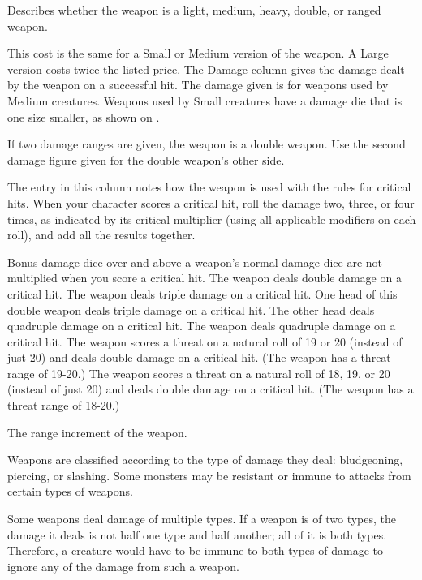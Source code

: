  Describes whether the weapon is a light, medium, heavy, double, or ranged weapon.

\par This cost is the same for a Small or Medium version of the weapon. A Large version costs twice the listed price.
 The Damage column gives the damage dealt by the weapon on a successful hit. The damage given is for weapons used by Medium creatures. Weapons used by Small creatures have a damage die that is one size smaller, as shown on .

If two damage ranges are given, the weapon is a double weapon. Use the second damage figure given for the double weapon's other side.

 The entry in this column notes how the weapon is used with the rules for critical hits. When your character scores a critical hit, roll the damage two, three, or four times, as indicated by its critical multiplier (using all applicable modifiers on each roll), and add all the results together.

 Bonus damage dice over and above a weapon's normal damage dice are not multiplied when you score a critical hit.
 The weapon deals double damage on a critical hit.
 The weapon deals triple damage on a critical hit.
 One head of this double weapon deals triple damage on a critical hit. The other head deals quadruple damage on a critical hit.
 The weapon deals quadruple damage on a critical hit.
 The weapon scores a threat on a natural roll of 19 or 20 (instead of just 20) and deals double damage on a critical hit. (The weapon has a threat range of 19-20.)
 The weapon scores a threat on a natural roll of 18, 19, or 20 (instead of just 20) and deals double damage on a critical hit. (The weapon has a threat range of 18-20.)

 The range increment of the weapon.

 Weapons are classified according to the type of damage they deal: bludgeoning, piercing, or slashing. Some monsters may be resistant or immune to attacks from certain types of weapons.

Some weapons deal damage of multiple types. If a weapon is of two types, the damage it deals is not half one type and half another; all of it is both types. Therefore, a creature would have to be immune to both types of damage to ignore any of the damage from such a weapon.

